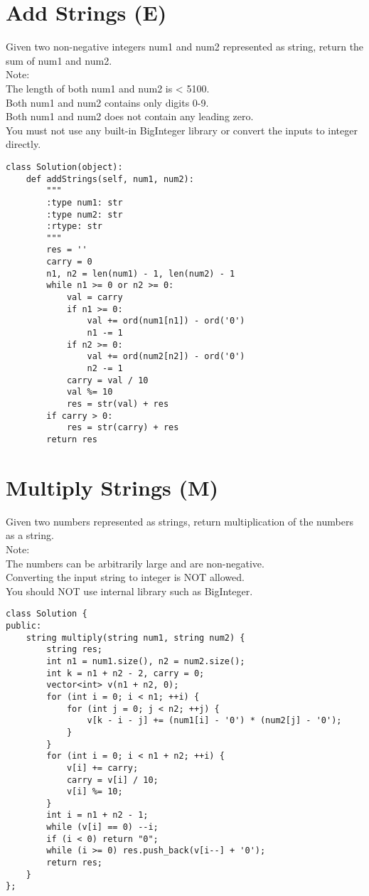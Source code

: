 \section{Add Strings (E)}
Given two non-negative integers num1 and num2 represented as string, return the sum of num1 and num2.\\

Note:\\
    The length of both num1 and num2 is < 5100.\\
    Both num1 and num2 contains only digits 0-9.\\
    Both num1 and num2 does not contain any leading zero.\\
    You must not use any built-in BigInteger library or convert the inputs to integer directly.\\
\begin{lstlisting}
class Solution(object):
    def addStrings(self, num1, num2):
        """
        :type num1: str
        :type num2: str
        :rtype: str
        """
        res = ''
        carry = 0
        n1, n2 = len(num1) - 1, len(num2) - 1
        while n1 >= 0 or n2 >= 0:
            val = carry
            if n1 >= 0: 
                val += ord(num1[n1]) - ord('0')
                n1 -= 1
            if n2 >= 0: 
                val += ord(num2[n2]) - ord('0')
                n2 -= 1
            carry = val / 10
            val %= 10
            res = str(val) + res
        if carry > 0:
            res = str(carry) + res
        return res
\end{lstlisting}

\section{Multiply Strings (M)}
Given two numbers represented as strings, return multiplication of the numbers as a string.\\

Note:\\
    The numbers can be arbitrarily large and are non-negative.\\
    Converting the input string to integer is NOT allowed.\\
    You should NOT use internal library such as BigInteger.\\

\begin{lstlisting}
class Solution {
public:
    string multiply(string num1, string num2) {
        string res;
        int n1 = num1.size(), n2 = num2.size();
        int k = n1 + n2 - 2, carry = 0;
        vector<int> v(n1 + n2, 0);
        for (int i = 0; i < n1; ++i) {
            for (int j = 0; j < n2; ++j) {
                v[k - i - j] += (num1[i] - '0') * (num2[j] - '0');
            }
        }
        for (int i = 0; i < n1 + n2; ++i) {
            v[i] += carry;
            carry = v[i] / 10;
            v[i] %= 10;
        }
        int i = n1 + n2 - 1;
        while (v[i] == 0) --i;
        if (i < 0) return "0";
        while (i >= 0) res.push_back(v[i--] + '0');
        return res;
    }
};
\end{lstlisting}


